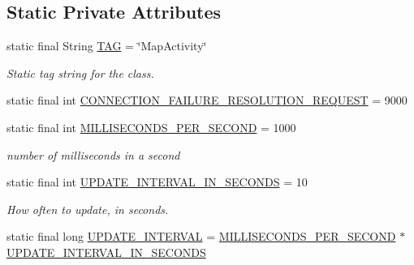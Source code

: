 \subsection*{Static Private Attributes}
\begin{DoxyCompactItemize}
\item 
static final String \hyperlink{classuk_1_1ac_1_1swan_1_1digitaltrails_1_1activities_1_1_map_activity_a602c8e98476fa0a148b49d61f62501dc}{T\+A\+G} = \char`\"{}Map\+Activity\char`\"{}
\begin{DoxyCompactList}\small\item\em Static tag string for the class. \end{DoxyCompactList}\item 
static final int \hyperlink{classuk_1_1ac_1_1swan_1_1digitaltrails_1_1activities_1_1_map_activity_a4817fced0cd0f1d8f8d5e6ba2c2d2414}{C\+O\+N\+N\+E\+C\+T\+I\+O\+N\+\_\+\+F\+A\+I\+L\+U\+R\+E\+\_\+\+R\+E\+S\+O\+L\+U\+T\+I\+O\+N\+\_\+\+R\+E\+Q\+U\+E\+S\+T} = 9000
\item 
static final int \hyperlink{classuk_1_1ac_1_1swan_1_1digitaltrails_1_1activities_1_1_map_activity_a91c817713b70954a38dd441d84c3e63c}{M\+I\+L\+L\+I\+S\+E\+C\+O\+N\+D\+S\+\_\+\+P\+E\+R\+\_\+\+S\+E\+C\+O\+N\+D} = 1000
\begin{DoxyCompactList}\small\item\em number of milliseconds in a second \end{DoxyCompactList}\item 
static final int \hyperlink{classuk_1_1ac_1_1swan_1_1digitaltrails_1_1activities_1_1_map_activity_a54804664f1186e4588950140c98a7830}{U\+P\+D\+A\+T\+E\+\_\+\+I\+N\+T\+E\+R\+V\+A\+L\+\_\+\+I\+N\+\_\+\+S\+E\+C\+O\+N\+D\+S} = 10
\begin{DoxyCompactList}\small\item\em How often to update, in seconds. \end{DoxyCompactList}\item 
static final long \hyperlink{classuk_1_1ac_1_1swan_1_1digitaltrails_1_1activities_1_1_map_activity_aef4c6da45d48652634a6586356192fe3}{U\+P\+D\+A\+T\+E\+\_\+\+I\+N\+T\+E\+R\+V\+A\+L} = \hyperlink{classuk_1_1ac_1_1swan_1_1digitaltrails_1_1activities_1_1_map_activity_a91c817713b70954a38dd441d84c3e63c}{M\+I\+L\+L\+I\+S\+E\+C\+O\+N\+D\+S\+\_\+\+P\+E\+R\+\_\+\+S\+E\+C\+O\+N\+D} $\ast$ \hyperlink{classuk_1_1ac_1_1swan_1_1digitaltrails_1_1activities_1_1_map_activity_a54804664f1186e4588950140c98a7830}{U\+P\+D\+A\+T\+E\+\_\+\+I\+N\+T\+E\+R\+V\+A\+L\+\_\+\+I\+N\+\_\+\+S\+E\+C\+O\+N\+D\+S}

\end{DoxyCompactItemize}
